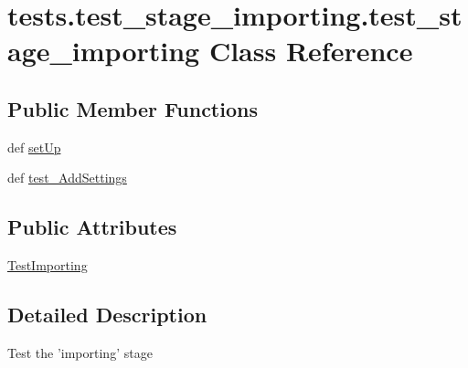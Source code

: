 \hypertarget{classtests_1_1test__stage__importing_1_1test__stage__importing}{\section{tests.\-test\-\_\-stage\-\_\-importing.\-test\-\_\-stage\-\_\-importing \-Class \-Reference}
\label{classtests_1_1test__stage__importing_1_1test__stage__importing}
}
\subsection*{\-Public \-Member \-Functions}
\begin{DoxyCompactItemize}
\item 
def \hyperlink{classtests_1_1test__stage__importing_1_1test__stage__importing_a955ad32b5675deb2dd658a47d613c231}{set\-Up}
\item 
def \hyperlink{classtests_1_1test__stage__importing_1_1test__stage__importing_ad37f1fc9fa274c87bb85001763f3f4fc}{test\-\_\-\-Add\-Settings}
\end{DoxyCompactItemize}
\subsection*{\-Public \-Attributes}
\begin{DoxyCompactItemize}
\item 
\hyperlink{classtests_1_1test__stage__importing_1_1test__stage__importing_a61f023156ee47bee611403e3d9a9857a}{\-Test\-Importing}
\end{DoxyCompactItemize}


\subsection{\-Detailed \-Description}
\begin{DoxyVerb}Test the 'importing' stage\end{DoxyVerb}
 

